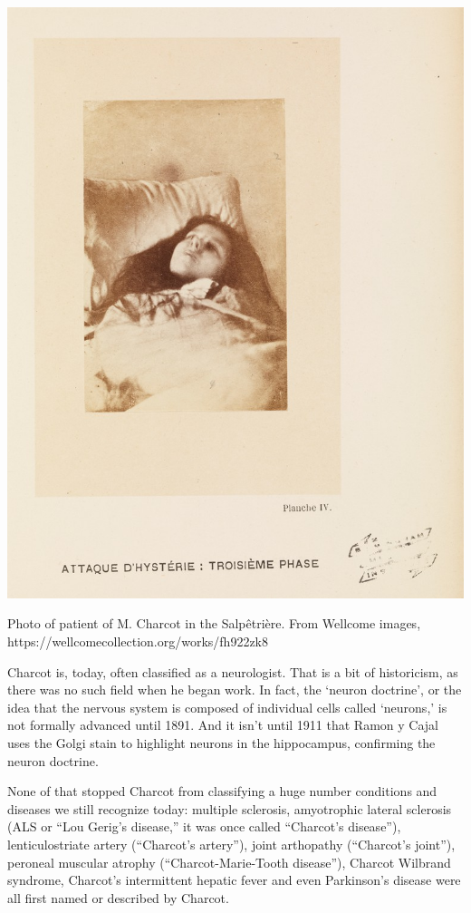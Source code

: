 \begin{refsection}
\begin{marginfigure}
 \begin{center}

     \includegraphics[scale=0.25]{../images/hysterie-troisiemephase.jpg}
\end{center}
 \caption{Photo of patient of M. Charcot in the Salpêtrière. From Wellcome images, https://wellcomecollection.org/works/fh922zk8 }
\label{fig: charcotpatient}
\end{marginfigure}


Charcot is, today, often classified as a neurologist. That is a bit of historicism, as there was no such field when he began work. In fact, the `neuron doctrine', or the idea that the nervous system is composed of individual cells called `neurons,' is not formally advanced until 1891. And it isn't until 1911 that Ramon y Cajal uses the Golgi stain to highlight neurons in the hippocampus, confirming the neuron doctrine.

None of that stopped Charcot from classifying a huge number conditions and diseases we still recognize today: multiple sclerosis, amyotrophic lateral sclerosis (ALS or ``Lou Gerig's disease,'' it was once called ``Charcot's disease''), lenticulostriate artery (``Charcot's artery''), joint arthopathy (``Charcot's joint''), peroneal muscular atrophy (``Charcot-Marie-Tooth disease''), Charcot Wilbrand syndrome, Charcot's intermittent hepatic fever and even Parkinson's disease were all first named or described by Charcot.


\end{refsection}
